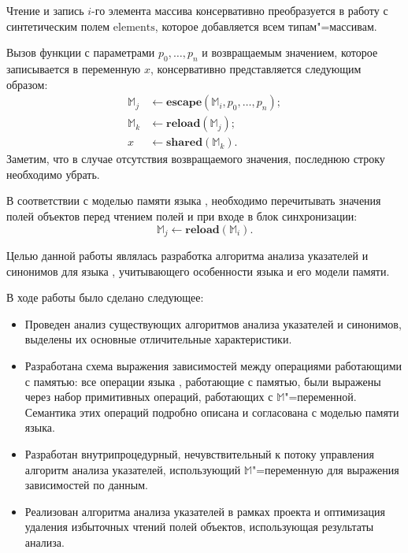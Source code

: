 \documentclass[14pt,titlepage,draft]{extarticle}
\newcommand{\java}{\eng{Java}\xspace}
\newcommand{\M}{\ensuremath{\mathbb{M}}}
\newcommand{\field}[1]{\mathrm{#1}}
\newcommand{\op}[1]{\mathbf{#1}}
\begin{document}
      Чтение и запись $i$-го элемента массива консервативно преобразуется в
      работу с синтетическим полем $\field{elements}$, которое добавляется всем
      типам"=массивам.

      Вызов функции с параметрами $p_0, \ldots, p_n$ и возвращаемым значением,
      которое записывается в переменную $x$, консервативно представляется
      следующим образом:
      \[\begin{aligned}
        \M_j &\gets \op{escape}(\M_i, p_0, \ldots, p_n); \\
        \M_k &\gets \op{reload}(\M_j); \\
        x    &\gets \op{shared}(\M_k).
      \end{aligned}\]
      Заметим, что в случае отсутствия возвращаемого значения, последнюю строку
      необходимо убрать.

      В соответствии с моделью памяти языка \java, необходимо перечитывать
      значения полей объектов перед чтением  полей и при входе в
      блок синхронизации:
      \[ \M_j \gets \op{reload}(\M_i). \]



    Целью данной работы являлась разработка алгоритма анализа указателей и
    синонимов для языка \java, учитывающего особенности языка и его модели
    памяти.

    В ходе работы было сделано следующее:
    \begin{itemize}
      \item Проведен анализ существующих алгоритмов анализа указателей и
            синонимов, выделены их основные отличительные характеристики.
      \item Разработана схема выражения зависимостей между операциями
            работающими с памятью: все операции языка \java, работающие с
            памятью, были выражены через набор примитивных операций, работающих
            с \M"=переменной. Семантика этих операций подробно описана и
            согласована с моделью памяти языка.
      \item Разработан внутрипроцедурный, нечувствительный к потоку управления
            алгоритм анализа указателей, использующий \M"=переменную для
            выражения зависимостей по данным.
      \item Реализован алгоритма анализа указателей в рамках проекта
             и оптимизация удаления избыточных чтений полей
            объектов, использующая результаты анализа.
    \end{itemize}
\end{document}
